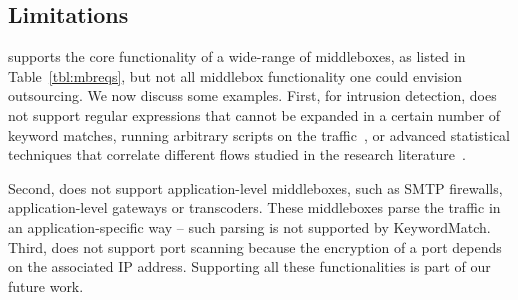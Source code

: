 \subsection{Limitations}\label{s:limitations}

 \sys supports the core functionality of a wide-range of  middleboxes, as listed in Table~\ref{tbl:mbreqs},
but not all middlebox functionality one could envision outsourcing. We now discuss some examples.
%
First, for intrusion detection, \sys does not support regular expressions that cannot be expanded 
in a certain number of keyword matches, running arbitrary scripts on the traffic~\cite{bro}, or advanced statistical techniques that correlate different flows
studied in the research literature~\cite{steppingstones}.

Second, \sys does not support application-level middleboxes, such as SMTP firewalls, application-level gateways or transcoders.
These middleboxes parse the traffic in an application-specific way -- such parsing is not supported by KeywordMatch.
%
Third, \sys does not support port scanning because the encryption of a port depends on the associated IP address. 
Supporting all these functionalities is part of our future work.


